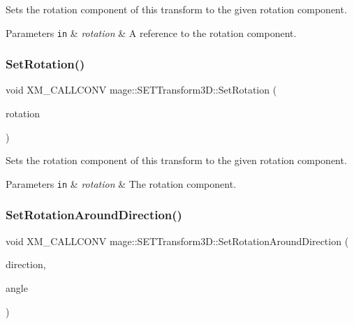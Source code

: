 Sets the rotation component of this transform to the given rotation component.


\begin{DoxyParams}[1]{Parameters}
\mbox{\tt in}  & {\em rotation} & A reference to the rotation component. \\
\hline
\end{DoxyParams}
\mbox{\label{classmage_1_1_s_e_t_transform3_d_ab01e80e33a479957cec03b4bb90ed811}} 
\subsubsection{\texorpdfstring{Set\+Rotation()}{SetRotation()}\hspace{0.1cm}{\footnotesize\ttfamily [3/3]}}
{\footnotesize\ttfamily void X\+M\+\_\+\+C\+A\+L\+L\+C\+O\+NV mage\+::\+S\+E\+T\+Transform3\+D\+::\+Set\+Rotation (\begin{DoxyParamCaption}\item[{F\+X\+M\+V\+E\+C\+T\+OR}]{rotation }\end{DoxyParamCaption})\hspace{0.3cm}{\ttfamily [noexcept]}}

Sets the rotation component of this transform to the given rotation component.


\begin{DoxyParams}[1]{Parameters}
\mbox{\tt in}  & {\em rotation} & The rotation component. \\
\hline
\end{DoxyParams}
\mbox{\label{classmage_1_1_s_e_t_transform3_d_a7bd81603a36f4f8edc09a28e74948c31}} 
\subsubsection{\texorpdfstring{Set\+Rotation\+Around\+Direction()}{SetRotationAroundDirection()}}
{\footnotesize\ttfamily void X\+M\+\_\+\+C\+A\+L\+L\+C\+O\+NV mage\+::\+S\+E\+T\+Transform3\+D\+::\+Set\+Rotation\+Around\+Direction (\begin{DoxyParamCaption}\item[{F\+X\+M\+V\+E\+C\+T\+OR}]{direction,  }\item[{\mbox{\hyperlink{namespacemage_aa97e833b45f06d60a0a9c4fc22ae02c0}{F32}}}]{angle }\end{DoxyParamCaption})\hspace{0.3cm}{\ttfamily [noexcept]}}

